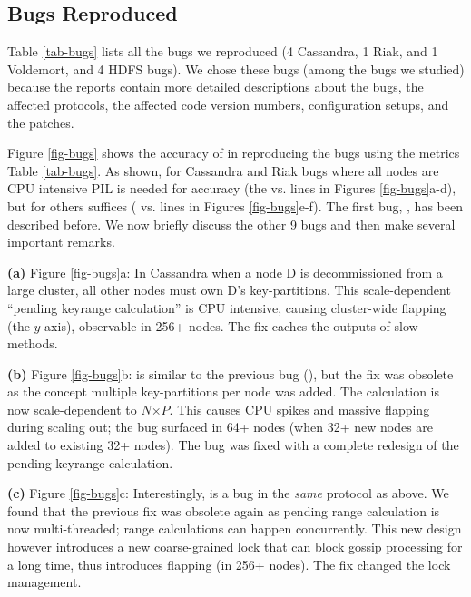 

\subsection{Bugs Reproduced}
\label{eval-bugs}






Table \ref{tab-bugs} lists all the \numEval bugs we  reproduced (4
Cassandra, 1 Riak, and 1 Voldemort, and 4 HDFS bugs).  We chose these
\numEval bugs (among the \totAll bugs we studied) because the reports
contain more detailed descriptions about the bugs, the affected protocols,
the affected code version numbers, configuration setups, and the patches.
%
%


Figure \ref{fig-bugs} shows the accuracy of \sck in reproducing the
\numEval bugs using the metrics Table \ref{tab-bugs}.
%
As shown, for Cassandra and Riak bugs where all nodes are CPU intensive
PIL is
needed for accuracy (the  vs.  lines 
in Figures \ref{fig-bugs}a-d), 
but for others \stest suffices
( vs.  lines in Figures \ref{fig-bugs}e-f).
%
The first bug, \caone, has been described before.
%
We now briefly discuss the other 9 bugs 
and then
%
make several important remarks.


{\bf (a)} Figure \ref{fig-bugs}a: In Cassandra \catwo \cite{CA-Two} when a node D is
decommissioned from a large cluster, all other nodes must own D's
key-partitions.  This scale-dependent ``pending keyrange calculation'' is
CPU intensive, causing cluster-wide flapping (the $y$ axis), observable in
256+ nodes.  The fix caches the outputs of slow methods.


{\bf (b)} Figure \ref{fig-bugs}b: \catri \cite{CA-Tri} is similar to the
previous bug (\catwo), but the fix was obsolete as the concept multiple
key-partitions per node was added.  The calculation is now scale-dependent
to $N$$\times$$P$.  This causes CPU spikes and massive flapping during
scaling out; the bug surfaced in 64+ nodes (when 32+ new nodes are added
to existing 32+ nodes). The bug was fixed with a complete redesign of the
pending keyrange calculation.
%





{\bf (c)} Figure \ref{fig-bugs}c: Interestingly, \cafour \cite{CA-Four} is
a bug in the {\em same} protocol as above.  We found that the previous fix
was obsolete again as pending range calculation is now multi-threaded;
range calculations can happen concurrently.  This new design however
introduces a new coarse-grained lock that can block gossip processing for
a long time, thus introduces flapping (in 256+ nodes).  The fix changed
the lock management.



